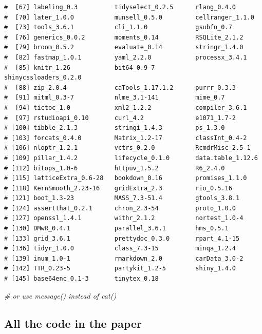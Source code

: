 \documentclass[
  12pt,
]{article}
\newenvironment{Shaded}{\begin{snugshade}}{\end{snugshade}}
\newcommand{\CommentTok}[1]{\textcolor[rgb]{0.56,0.35,0.01}{\textit{#1}}}
\begin{document}
\begin{verbatim}
#  [67] labeling_0.3          tidyselect_0.2.5      rlang_0.4.0           
#  [70] later_1.0.0           munsell_0.5.0         cellranger_1.1.0      
#  [73] tools_3.6.1           cli_1.1.0             gsubfn_0.7            
#  [76] generics_0.0.2        moments_0.14          RSQLite_2.1.2         
#  [79] broom_0.5.2           evaluate_0.14         stringr_1.4.0         
#  [82] fastmap_1.0.1         yaml_2.2.0            processx_3.4.1        
#  [85] knitr_1.26            bit64_0.9-7           shinycssloaders_0.2.0 
#  [88] zip_2.0.4             caTools_1.17.1.2      purrr_0.3.3           
#  [91] mitml_0.3-7           nlme_3.1-141          mime_0.7              
#  [94] tictoc_1.0            xml2_1.2.2            compiler_3.6.1        
#  [97] rstudioapi_0.10       curl_4.2              e1071_1.7-2           
# [100] tibble_2.1.3          stringi_1.4.3         ps_1.3.0              
# [103] forcats_0.4.0         Matrix_1.2-17         classInt_0.4-2        
# [106] nloptr_1.2.1          vctrs_0.2.0           RcmdrMisc_2.5-1       
# [109] pillar_1.4.2          lifecycle_0.1.0       data.table_1.12.6     
# [112] bitops_1.0-6          httpuv_1.5.2          R6_2.4.0              
# [115] latticeExtra_0.6-28   bookdown_0.16         promises_1.1.0        
# [118] KernSmooth_2.23-16    gridExtra_2.3         rio_0.5.16            
# [121] boot_1.3-23           MASS_7.3-51.4         gtools_3.8.1          
# [124] assertthat_0.2.1      chron_2.3-54          proto_1.0.0           
# [127] openssl_1.4.1         withr_2.1.2           nortest_1.0-4         
# [130] DMwR_0.4.1            parallel_3.6.1        hms_0.5.1             
# [133] grid_3.6.1            prettydoc_0.3.0       rpart_4.1-15          
# [136] tidyr_1.0.0           class_7.3-15          minqa_1.2.4           
# [139] inum_1.0-1            rmarkdown_2.0         carData_3.0-2         
# [142] TTR_0.23-5            partykit_1.2-5        shiny_1.4.0           
# [145] base64enc_0.1-3       tinytex_0.18          
\end{verbatim}

\begin{Shaded}
\begin{Highlighting}[]
  \CommentTok{# or use message() instead of cat()}
\end{Highlighting}
\end{Shaded}

\hypertarget{all-the-code-in-the-paper}{%
\subsection{All the code in the paper}\label{all-the-code-in-the-paper}}
\end{document}
